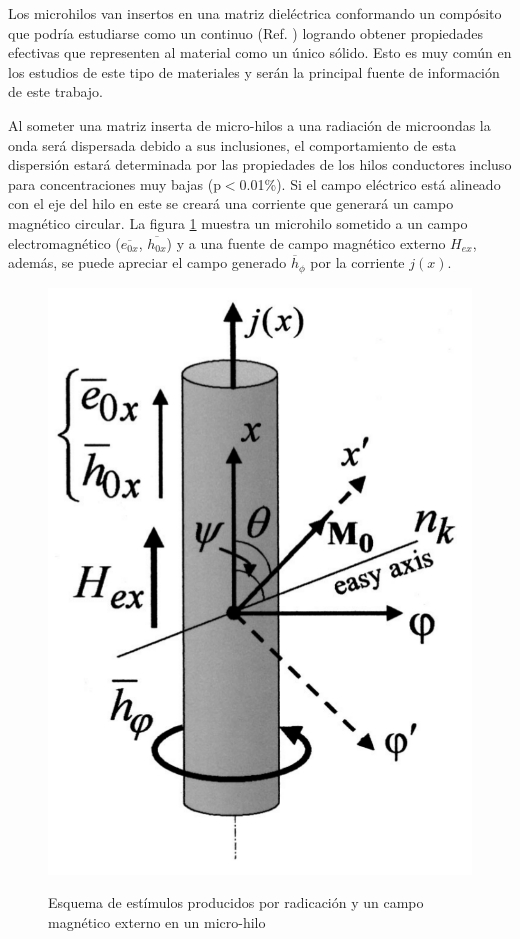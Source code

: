 \documentclass[12pt,letterpaper]{article}
\numberwithin{equation}{section}
\begin{document}
Los microhilos van insertos en una matriz dieléctrica conformando un compósito que podría estudiarse como un continuo (Ref. \cite{Wire_theory_1,Wire_theory_2}) logrando obtener propiedades efectivas que representen al material como un único sólido. Esto es muy común en los estudios de este tipo de materiales \cite{Wire_theory_1, Wire_theory_2,Wire_backgound,Wire_permeability} y serán la principal fuente de información de este trabajo.

Al someter una matriz inserta de micro-hilos a una radiación de microondas la onda será dispersada debido a sus inclusiones, el comportamiento de esta dispersión estará determinada por las propiedades de los hilos conductores incluso para concentraciones muy bajas (p$<$0.01\%). Si el campo eléctrico está alineado con el eje del hilo en este se creará una corriente que generará un campo magnético circular. La figura \ref{fig:Esquema_hilo} muestra un microhilo sometido a un campo electromagnético ($\overline{e_{0x}}$, $\overline{h_{0x}}$) y a una fuente de campo magnético externo $H_{ex}$, además, se puede apreciar el campo generado $\overline{h}_{\phi}$ por la corriente $j(x)$.
 
\begin{figure}[H]
	\centering\includegraphics[scale=0.3]{Imagenes/Esquema_hilo.png}\\
	\caption{Esquema de estímulos producidos por radicación y un campo magnético externo en un micro-hilo}
	\label{fig:Esquema_hilo}
\end{figure} 
\end{document}
